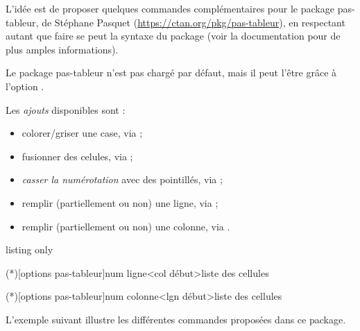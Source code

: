 \documentclass[french,11pt,a4paper]{article}
\begin{document}
L'idée est de proposer quelques commandes complémentaires pour le package \textsf{pas-tableur}, de Stéphane Pasquet (\url{https://ctan.org/pkg/pas-tableur}), en respectant autant que faire se peut la syntaxe du package (voir la documentation pour de plus amples informations).

\smallskip

Le package \textsf{pas-tableur} n'est pas chargé par défaut, mais il peut l'être grâce à l'option \MontreCode{[pastableur]}.

\smallskip

Les \textit{ajouts} disponibles sont :

\begin{itemize}
	\item colorer/griser une case, via  ;
	\item fusionner des celules, via  ;
	\item \textit{casser la numérotation} avec des pointillés, via  ;
	\item remplir (partiellement ou non) une ligne,  via  ;
	\item remplir (partiellement ou non) une colonne,  via .
\end{itemize}

\begin{DemoCode}{listing only}
\usepackage[pastableur]{customenvs}




\lignetxt(*)[options pas-tableur]{num ligne}<col début>{liste des cellules}

\colonnetxt(*)[options pas-tableur]{num colonne}<lgn début>{liste des cellules}
\end{DemoCode}

\pagebreak

L'exemple suivant illustre les différentes commandes proposées dans ce package.

\begin{DemoCode}{}
\end{DemoCode}
\end{document}
